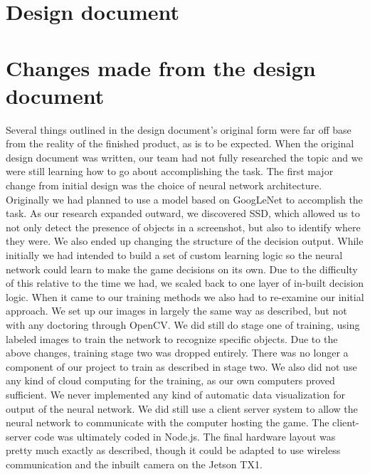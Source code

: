 \documentclass[onecolumn, draftclsnofoot,10pt, compsoc]{IEEEtran}
\begin{document}
\section{Design document}



\section{Changes made from the design document}
Several things outlined in the design document's original form were far off base from the reality of the finished product, as is to be expected.
When the original design document was written, our team had not fully researched the topic and we were still learning how to go about accomplishing the task. 
The first major change from initial design was the choice of neural network architecture. 
Originally we had planned to use a model based on GoogLeNet to accomplish the task.
As our research expanded outward, we discovered SSD, which allowed us to not only detect the presence of objects in a screenshot, but also to identify where they were.
We also ended up changing the structure of the decision output.
While initially we had intended to build a set of custom learning logic so the neural network could learn to make the game decisions on its own.
Due to the difficulty of this relative to the time we had, we scaled back to one layer of in-built decision logic.
\newline\newline
When it came to our training methods we also had to re-examine our initial approach.
We set up our images in largely the same way as described, but not with any doctoring through OpenCV.
We did still do stage one of training, using labeled images to train the network to recognize specific objects.
Due to the above changes, training stage two was dropped entirely.
There was no longer a component of our project to train as described in stage two.
We also did not use any kind of cloud computing for the training, as our own computers proved sufficient.
\newline\newline
We never implemented any kind of automatic data visualization for output of the neural network.
We did still use a client server system to allow the neural network to communicate with the computer hosting the game.
The client-server code was ultimately coded in Node.js.
The final hardware layout was pretty much exactly as described, though it could be adapted to use wireless communication and the inbuilt camera on the Jetson TX1.
\end{document}
